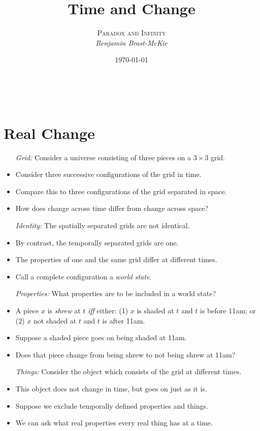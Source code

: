 \documentclass[a4paper, 11pt]{article} %
\title{\textbf{Time and Change}} %
\author{\textsc{Paradox and Infinity}\\ \em Benjamin Brast-McKie} %
\date{\today} %
\makeatletter
\renewcommand{\maketitle}{ %
\begin{flushright} %
{\LARGE\@title} %

\vspace{10pt} %

{\@author} %
\\\@date %

\vspace{50pt} %
\end{flushright}
}
\makeatother
\begin{document}
\maketitle %

\thispagestyle{empty}


\section*{Real Change}

\begin{itemize}
  \item[\it Grid:] Consider a universe consisting of three pieces on a $3 \times 3$ grid. 
    \item Consider three successive configurations of the grid in time.
    \item Compare this to three configurations of the grid separated in space. 
    \item How does change across time differ from change across space?
  \item[\it Identity:] The spatially separated grids are not identical.
    \item By contrast, the temporally separated grids are one.
    \item The properties of one and the same grid differ at different times.
    \item Call a complete configuration a \textit{world state}.
  \item[\it Properties:] What properties are to be included in a world state?
    \item A piece $x$ is \textit{shrew} at $t$ \textit{iff} either: (1) $x$ is shaded at $t$ and $t$ is before 11am; or (2) $x$ not shaded at $t$ and $t$ is after 11am.
    \item Suppose a shaded piece goes on being shaded at 11am.
    \item Does that piece change from being shrew to not being shrew at 11am?
  \item[\it Things:] Consider the object which consists of the grid at different times.
    \item This object does not change in time, but goes on just as it is.
    \item Suppose we exclude temporally defined properties and things.
    \item We can ask what real properties every real thing has at a time.

\end{itemize}
\end{document}
